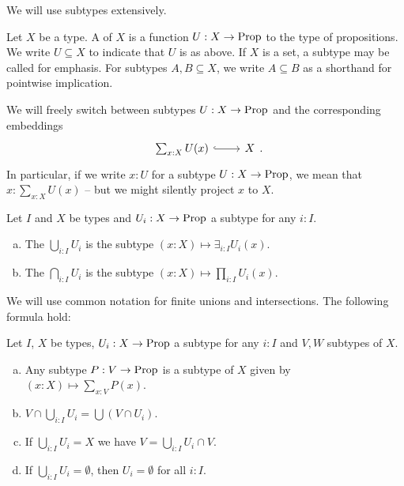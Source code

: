 We will use subtypes extensively.

\begin{definition}
  \index{$\subseteq$}
  Let $X$ be a type.
  A  of $X$ is a function $U:X\to\mathrm{Prop}$ to the type of propositions.
  We write $U\subseteq X$ to indicate that $U$ is as above.
  If $X$ is a set, a subtype may be called  for emphasis.
  For subtypes $A,B\subseteq X$, we write $A\subseteq B$ as a shorthand for pointwise implication.
\end{definition}

We will freely switch between subtypes $U:X\to\mathrm{Prop}$ and the corresponding embeddings
\[
  \begin{tikzcd}
    \sum_{x:X}U(x) \ar[r,hook] & X
  \end{tikzcd}
  \rlap{.}
\]
In particular, if we write $x:U$ for a subtype $U:X\to\mathrm{Prop}$, we mean that $x:\sum_{x:X}U(x)$ -- but we might silently project $x$ to $X$.

\begin{definition}
  Let $I$ and $X$ be types and $U_i:X\to\mathrm{Prop}$ a subtype for any $i:I$.
  \begin{enumerate}[(a)]
  \item The  $\bigcup_{i:I}U_i$ is the subtype $(x:X)\mapsto \exists_{i:I}U_i(x)$.
  \item The  $\bigcap_{i:I}U_i$ is the subtype $(x:X)\mapsto\prod_{i:I}U_i(x)$.
  \end{enumerate}
\end{definition}

We will use common notation for finite unions and intersections.
The following formula hold:

\begin{lemma}
  Let $I$, $X$ be types, $U_i:X\to\mathrm{Prop}$ a subtype for any $i:I$ and $V,W$ subtypes of $X$.
  \begin{enumerate}[(a)]
  \item Any subtype $P:V\to\mathrm{Prop}$ is a subtype of $X$ given by $(x:X)\mapsto\sum_{x:V}P(x)$.
  \item $V\cap \bigcup_{i:I} U_i=\bigcup (V\cap U_i)$.
  \item If $\bigcup_{i:I}U_i=X$ we have $V=\bigcup_{i:I}U_i\cap V$.
  \item If $\bigcup_{i:I}U_i=\emptyset$, then $U_i=\emptyset$ for all $i:I$.
  \end{enumerate}
\end{lemma}

